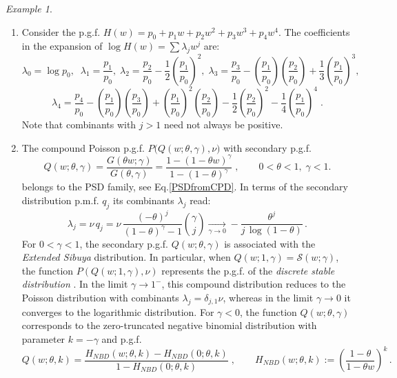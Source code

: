 \documentclass[a4paper,12pt]{amsart}
\theoremstyle{definition}
\theoremstyle{remark}
\newtheorem{Example}{Example}[section]
\begin{document}
\begin{Example}\mbox{} \smallskip
\begin{enumerate}[label=(\roman*), leftmargin=*]
\item Consider the p.g.f. $H(w)=p_0+p_1 w+p_2 w^2+p_3 w^3+p_4 w^4$. The coefficients in the expansion of $\log H(w)=\sum \lambda_j w^j$  are:
    \[
    \lambda_0=\log p_0,\;
    \;\lambda_1=\frac{p_1}{p_0},\;
    \lambda_2=\frac{ p_2}{p_0}-\frac{1}{2}\left(\frac{p_1}{p_0}\right)^2,\;
    \lambda_3=\frac{ p_3}{p_0}-\left(\frac{p_1}{p_0}\right) \left(\frac{p_2}{p_0}\right) +\frac{1}{3}\left (\frac{p_1}{p_0}\right)^3,\;  
    \]
    \[
     \lambda_4=\frac{ p_4}{p_0}-\left(\frac{p_1}{p_0}\right) \left(\frac{p_3}{p_0}\right)+ \left(\frac{p_1}{p_0}\right)^2 \left(\frac{p_2}{p_0} \right)-               \frac{1}{2}\left(\frac{p_2}{p_0}\right)^2   -\frac{1}{4}\left (\frac{p_1}{p_0}\right)^4
     \;.
    \]
    Note that combinants with $j>1$ need not always be positive.
 \item The compound Poisson p.g.f. $P\bigl(Q(w;\theta,\gamma),\nu\bigr)$ with secondary  p.g.f. 
\begin{equation}\label{Pois-ExSbtrNBD}
Q(w;\theta,\gamma)=\frac{G(\theta w;\gamma)}{G(\theta,\gamma)}=\frac{1-(1-\theta w)^{\gamma}}{1-(1-\theta)^{\gamma}}\;,\qquad 0<\theta<1,\;\gamma<1.
\end{equation}
belongs to the PSD family, see Eq.\ref{PSDfromCPD}. In terms of the secondary distribution p.m.f. $q_j$ its  combinants $\lambda_j$ read:
\begin{equation}
\lambda_j = \nu\, q_j 
= \nu\,\frac{(-\theta )^j}{(1-\theta )^{\gamma }-1}\binom{\gamma }{j} 
\xrightarrow[\gamma\to 0]{} -\frac{\theta^j}{j\,\log (1-\theta )}\,.
\end{equation}
For $0<\gamma<1$, the secondary p.g.f. $Q(w;\theta,\gamma)$ is associated with the {\it Extended Sibuya} distribution. In particular, when $Q(w;1,\gamma)=\mathcal{S}(w;\gamma)$, the function $P(Q(w;1,\gamma),\nu)$ represents the p.g.f. of the {\it discrete stable distribution} \cite{Christoph1998a}. In the limit $\gamma\to 1^{-}$, this compound distribution reduces to the Poisson distribution with combinants $\lambda_j=\delta_{j,1}\nu$, whereas in the limit $\gamma\to 0$ it converges to the logarithmic distribution. For $\gamma<0$, the function $Q(w;\theta,\gamma)$ corresponds to the zero-truncated negative binomial distribution with parameter $k=-\gamma$ and p.g.f.
\begin{equation} \label{eq:nbdtrunc}
Q(w;\theta,k)
=\frac{H_{NBD}(w;\theta,k) -H_{NBD}(0;\theta,k)}{1-H_{NBD}(0;\theta,k)}\;,\qquad 
H_{NBD}(w;\theta,k):=\left(\frac{1-\theta}{1-\theta w}\right)^k\, .
\end{equation}
\end{enumerate} 
\end{Example}
\end{document}
